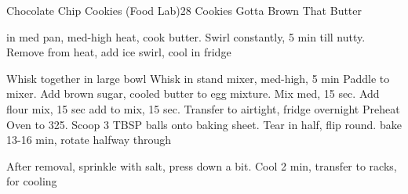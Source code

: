 \documentclass[a6paper,landscape]{article}
\begin{document}
\begin{recipe}{Chocolate Chip Cookies (Food Lab)}{28 Cookies}{}
  \freeform Gotta Brown That Butter


  in med pan, med-high heat, cook butter. Swirl constantly, 5 min till nutty. Remove from heat, add ice swirl, cool in fridge

  Whisk together in large bowl
  Whisk in stand mixer, med-high, 5 min
  Paddle to mixer. Add  brown sugar, cooled butter to egg mixture. Mix med, 15 sec. Add flour mix, 15 sec
  add to mix, 15 sec. Transfer to airtight, fridge overnight
  \newstep
  Preheat Oven to 325. Scoop 3 TBSP balls onto baking sheet. Tear in half, flip round.
  \newstep
  bake 13-16 min, rotate halfway through

  After removal, sprinkle with salt, press down a bit. Cool 2 min, transfer to racks, for cooling
  \end{recipe}
\end{document}
